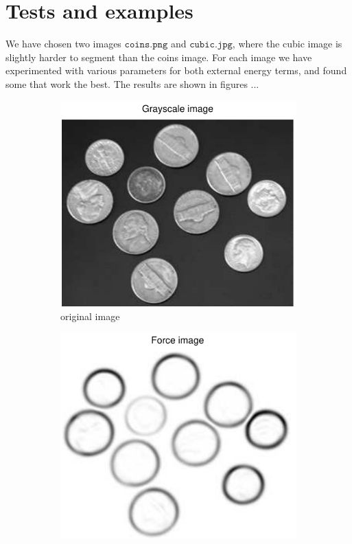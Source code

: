 \documentclass[11pt,a4paper]{article}
\begin{document}
\section{Tests and examples}
%
We have chosen two images $\texttt{coins.png}$ and $\texttt{cubic.jpg}$, where the cubic image is slightly harder to segment than the coins image. For each image we have experimented with various parameters for both external energy terms, and found some that work the best. The results are shown in figures ...
%
\begin{figure}[H]
    \centering
    \begin{subfigure}[t]{0.48\textwidth}
        \includegraphics[width=\textwidth]{src/images/coins_gradient_gray.pdf}
        \caption{original image}
        \label{fig:coins_original}
    \end{subfigure}
    \begin{subfigure}[t]{0.48\textwidth}
        \includegraphics[width=\textwidth]{src/images/coins_gradient_forces.pdf}

\end{subfigure}
\end{figure}
\end{document}
